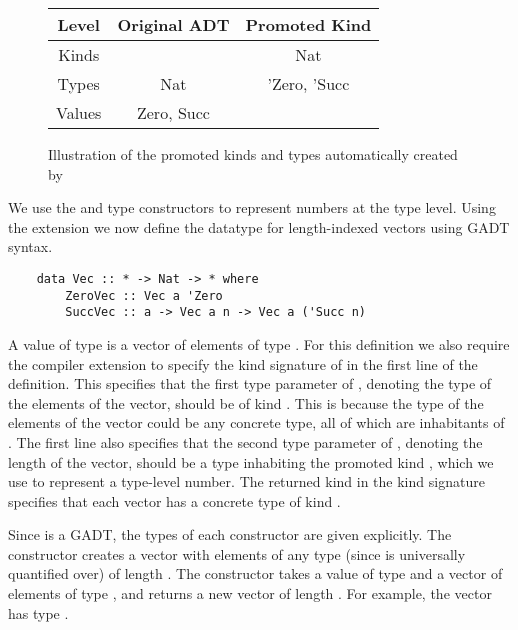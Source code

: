\begin{figure}[h]
    \centering
    \begin{tabular}{ |c|c|c| } 
        \hline
        Level & Original ADT & Promoted Kind \\
        \hline 
        Kinds &  & Nat \\
        Types & Nat & 'Zero, 'Succ \\
        Values & Zero, Succ & \\
        \hline
    \end{tabular}
    \caption{Illustration of the promoted kinds and types automatically created by }
    \label{fig:datakindsPromotion}
\end{figure}


We use the  and  type constructors to represent numbers at the type level. Using the  extension we now define the datatype for length-indexed vectors using GADT syntax.

\begin{lstlisting}
    data Vec :: * -> Nat -> * where
        ZeroVec :: Vec a 'Zero
        SuccVec :: a -> Vec a n -> Vec a ('Succ n)
\end{lstlisting}
\cite{GADTs}

A value of type  is a vector of  elements of type . For this definition we also require the  compiler extension to specify the kind signature of  in the first line of the definition. This specifies that the first type parameter of , denoting the type of the elements of the vector, should be of kind \code{*}. This is because the type of the elements of the vector could be any concrete type, all of which are inhabitants of \code{*}. The first line also specifies that the second type parameter of , denoting the length of the vector, should be a type inhabiting the promoted kind , which we use to represent a type-level number. The returned kind \code{*} in the kind signature specifies that each vector has a concrete type of kind \code{*}.

Since  is a GADT, the types of each constructor are given explicitly. The  constructor creates a vector with elements of any type (since  is universally quantified over) of length . The  constructor takes a value of type  and a vector of  elements of type , and returns a new vector of length . For example, the vector  has type .

